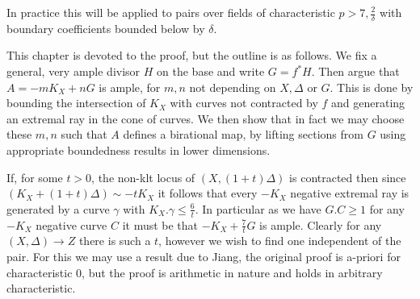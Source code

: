 \begin{remark}
	In practice this will be applied to pairs over fields of characteristic $p > 7,\frac{2}{\delta}$ with boundary coefficients bounded below by $\delta$.
\end{remark}

This chapter is devoted to the proof, but the outline is as follows. We fix a general, very ample divisor $H$ on the base and write $G=f^{*}H$. Then argue that $A=-mK_{X}+nG$ is ample, for $m,n$ not depending on $X,\Delta$ or $G$. This is done by bounding the intersection of $K_{X}$ with curves not contracted by $f$ and generating an extremal ray in the cone of curves. We then show that in fact we may choose these $m,n$ such that $A$ defines a birational map, by lifting sections from $G$ using appropriate boundedness results in lower dimensions. 

If, for some $t>0$, the non-klt locus of $(X,(1+t)\Delta)$ is contracted then since $(K_{X}+(1+t)\Delta) \sim -tK_{X}$ it follows that every $-K_{X}$ negative extremal ray is generated by a curve $\gamma$ with $K_{X}.\gamma \leq \frac{6}{t}$. In particular as we have $G.C \geq 1$ for any $-K_{X}$ negative curve $C$ it must be that $-K_{X}+\frac{7}{t}G$ is ample. Clearly for any $(X,\Delta) \to Z$ there is such a $t$, however we wish to find one independent of the pair. For this we may use a result due to Jiang, the original proof is a-priori for characteristic $0$, but the proof is arithmetic in nature and holds in arbitrary characteristic.

